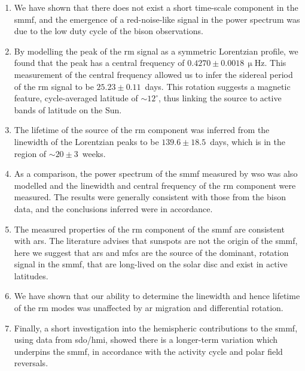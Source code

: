 \begin{enumerate}
	\item{We have shown that there does not exist a short time-scale component in the \gls{smmf}, and the emergence of a red-noise-like signal in the power spectrum was due to the low duty cycle of the \gls{bison} observations.}
	
	\item{By modelling the peak of the \gls{rm} signal as a symmetric Lorentzian profile, we found that the peak has a central frequency of $0.4270\pm0.0018\,\upmu\mathrm{Hz}$. This measurement of the central frequency allowed us to infer the sidereal period of the \gls{rm} signal to be $25.23\pm0.11$~days. This rotation suggests a magnetic feature, cycle-averaged latitude of $\sim 12^{\circ}$, thus linking the source to active bands of latitude on the Sun.}
	
	\item{The lifetime of the source of the \gls{rm} component was inferred from the linewidth of the Lorentzian peaks to be $139.6\pm18.5$~days, which is in the region of $\sim20\pm3$~weeks.}
	
	\item{As a comparison, the power spectrum of the \gls{smmf} measured by \gls{wso} was also modelled and the linewidth and central frequency of the \gls{rm} component were measured. The results were generally consistent with those from the \gls{bison} data, and the conclusions inferred were in accordance.}
	
	\item{The measured properties of the \gls{rm} component of the \gls{smmf} are consistent with \glspl{ar}. The literature advises that sunspots are not the origin of the \gls{smmf}, here we suggest that \glspl{ar} and \glspl{mfc} are the source of the dominant, rotation signal in the \gls{smmf}, that are long-lived on the solar disc and exist in active latitudes.}
		
	\item{We have shown that our ability to determine the linewidth and hence lifetime of the \gls{rm} modes was unaffected by \gls{ar} migration and differential rotation.}
	
	
	\item{Finally, a short investigation into the hemispheric contributions to the \gls{smmf}, using data from \gls{sdo/hmi}, showed there is a longer-term variation which underpins the \gls{smmf}, in accordance with the activity cycle and polar field reversals.}
\end{enumerate}


